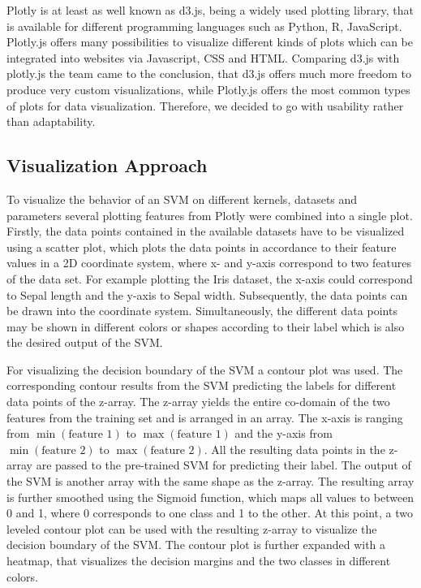 \documentclass{scrartcl}
\begin{document}
Plotly is at least as well known as d3.js, being a widely used plotting library, that is available for different programming languages such as Python, R, JavaScript. Plotly.js offers many possibilities to visualize different kinds of plots which can be integrated into websites via Javascript, CSS and HTML. Comparing d3.js with plotly.js the team came to the conclusion, that d3.js offers much more freedom to produce very custom visualizations, while Plotly.js offers the most common types of plots for data visualization. Therefore, we decided to go with usability rather than adaptability.

\subsection{Visualization Approach}

To visualize the behavior of an SVM on different kernels, datasets and parameters several plotting features from Plotly were combined into a single plot. 
Firstly, the data points contained in the available datasets have to be visualized using a scatter plot, which plots the data points in accordance to their feature values in a 2D coordinate system, where x- and y-axis correspond to two features of the data set. 
For example plotting the Iris dataset, the x-axis could correspond to Sepal length and the y-axis to Sepal width. Subsequently, the data points can be drawn into the coordinate system. Simultaneously, the different data points may be shown in different colors or shapes according to their label which is also the desired output of the SVM.

For visualizing the decision boundary of the SVM a contour plot was used. The
corresponding contour results from the SVM predicting the labels for different
data points of the z-array. The z-array yields the entire co-domain of the two
features from the training set and is arranged in an array.
The x-axis is ranging from $\min(\text{feature~1})$ to $\max(\text{feature~1})$
and the y-axis from $\min(\text{feature~2})$ to $\max(\text{feature~2})$.
All the resulting data points in the z-array are passed to the pre-trained SVM for predicting their label. The output of the SVM is another array with the same shape as the z-array. The resulting array is further smoothed using the Sigmoid function, which maps all values to between 0 and 1, where 0 corresponds to one class and 1 to the other. 
At this point, a two leveled contour plot can be used with the resulting z-array  to visualize the decision boundary of the SVM. The contour plot is further expanded with a heatmap, that visualizes the decision margins and the two classes in different colors.
\end{document}
